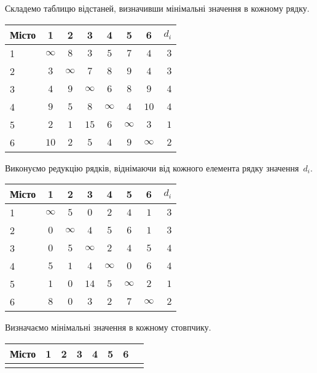 \documentclass[a4paper,oneside,DIV=12,12pt]{scrartcl}
\begin{document}
	\begin{solution}
		Складемо таблицю відстаней, визначивши мінімальні значення в кожному рядку.
		
		\begin{longtable}[c]{lccccccr}
			\toprule
				Місто & 1 & 2 & 3 & 4 & 5 & 6 & $d_i$\\
			\midrule
			\endhead
			\bottomrule
			\endfoot
			
				1 & $\infty$ & $8$      & $3$      & $5$      & $7$      & $4$      & $3$\\
				2 & $3$      & $\infty$ & $7$      & $8$      & $9$      & $4$      & $3$\\
				3 & $4$      & $9$      & $\infty$ & $6$      & $8$      & $9$      & $4$\\
				4 & $9$      & $5$      & $8$      & $\infty$ & $4$      & $10$     & $4$\\
				5 & $2$      & $1$      & $15$     & $6$      & $\infty$ & $3$      & $1$\\
				6 & $10$     & $2$      & $5$      & $4$      & $9$      & $\infty$ & $2$\\
		\end{longtable}
		
		Виконуємо редукцію рядків, віднімаючи від кожного елемента рядку значення~$d_i$.
		
		\begin{longtable}[c]{lccccccr}
			\toprule
				Місто & 1 & 2 & 3 & 4 & 5 & 6 & $d_i$\\
			\midrule
			\endhead
			\bottomrule
			\endfoot
			
				1 & $\infty$ & $5$      & $0$      & $2$      & $4$      & $1$      & $3$\\
				2 & $0$      & $\infty$ & $4$      & $5$      & $6$      & $1$      & $3$\\
				3 & $0$      & $5$      & $\infty$ & $2$      & $4$      & $5$      & $4$\\
				4 & $5$      & $1$      & $4$      & $\infty$ & $0$      & $6$      & $4$\\
				5 & $1$      & $0$      & $14$     & $5$      & $\infty$ & $2$      & $1$\\
				6 & $8$      & $0$      & $3$      & $2$      & $7$      & $\infty$ & $2$\\
		\end{longtable}
		
		Визначаємо мінімальні значення в кожному стовпчику.
		
		\begin{longtable}[c]{lccccccr}
			\toprule
				Місто & 1 & 2 & 3 & 4 & 5 & 6\\
			\midrule
			\endhead
			\bottomrule
			\endfoot
			

\end{longtable}
\end{solution}
\end{document}
